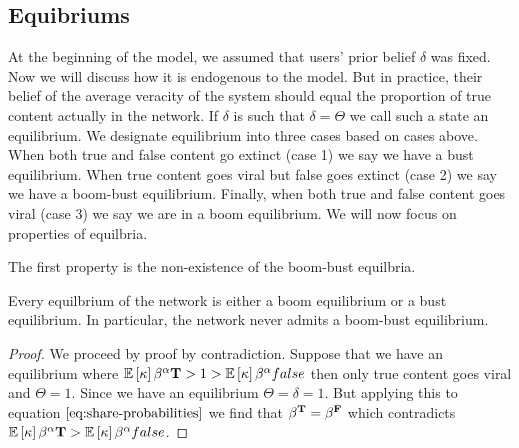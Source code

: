 \subsection{Equibriums} 

At the beginning of the model, we assumed that users' prior belief $\delta$ was fixed. Now we will discuss how it is endogenous to the model. But in practice, their belief of the average veracity of the system should equal the proportion of true content actually in the network. If $\delta $ is such that $\delta = \Theta$ we call such a state an equilibrium. We designate equilibrium into three cases based on cases above. When both true and false content go extinct (case 1) we say we have a bust equilibrium. When true content goes viral but false goes extinct (case 2) we say we have a boom-bust equilibrium. Finally, when both true and false content goes viral (case 3) we say we are in a boom equilibrium.  We will now focus on properties of equilbria. 

The first property is the non-existence of the boom-bust equilbria. 
\begin{theorem}
    Every equilbrium of the network is either a boom equilibrium or a bust equilibrium. In particular, the network never admits a boom-bust equilibrium. 
\end{theorem}
\begin{proof}
    We proceed by proof by contradiction. Suppose that we have an equilibrium where $\mathbb{E}\left[ \kappa \right] \beta^{\alpha}{\mathbf{T}} > 1 > \mathbb{E}\left[ \kappa \right] \beta^{\alpha}{false}$ then only true content goes viral and $\Theta=1$. Since we have an equilibrium $\Theta = \delta = 1$. But applying this to equation $\ref{eq:share-probabilities}$ we find that $\beta^{\mathbf{T}} = \beta^{\mathbf{F}}$ which contradicts $\mathbb{E}\left[ \kappa \right] \beta^{\alpha}{\mathbf{T}} >\mathbb{E}\left[ \kappa \right] \beta^{\alpha}{false}$. 
\end{proof}

